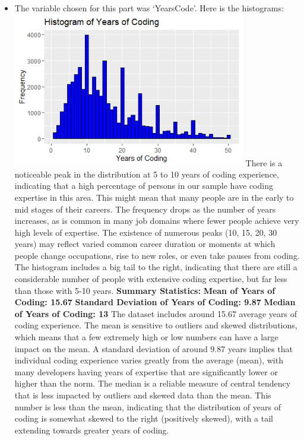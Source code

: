 \documentclass[
  12pt,
]{article}
\providecommand{\tightlist}{%
  \setlength{\itemsep}{0pt}\setlength{\parskip}{0pt}}
\begin{document}
\begin{itemize}
\tightlist
\item
  The variable chosen for this part was `YearsCode'. Here is the
  histograms:
  \includegraphics[width=0.8\textwidth,height=0.8\textheight]{yearsCode_numeric_histogram.png}
  There is a noticeable peak in the distribution at 5 to 10 years of
  coding experience, indicating that a high percentage of persons in our
  sample have coding expertise in this area. This might mean that many
  people are in the early to mid stages of their careers. The frequency
  drops as the number of years increases, as is common in many job
  domains where fewer people achieve very high levels of expertise. The
  existence of numerous peaks (10, 15, 20, 30 years) may reflect varied
  common career duration or moments at which people change occupations,
  rise to new roles, or even take pauses from coding. The histogram
  includes a big tail to the right, indicating that there are still a
  considerable number of people with extensive coding expertise, but far
  less than those with 5-10 years. \textbf{Summary Statistics:}
  \textbf{Mean of Years of Coding: 15.67} \textbf{Standard Deviation of
  Years of Coding: 9.87} \textbf{Median of Years of Coding: 13} The
  dataset includes around 15.67 average years of coding experience. The
  mean is sensitive to outliers and skewed distributions, which means
  that a few extremely high or low numbers can have a large impact on
  the mean. A standard deviation of around 9.87 years implies that
  individual coding experience varies greatly from the average (mean),
  with many developers having years of expertise that are significantly
  lower or higher than the norm. The median is a reliable measure of
  central tendency that is less impacted by outliers and skewed data
  than the mean. This number is less than the mean, indicating that the
  distribution of years of coding is somewhat skewed to the right
  (positively skewed), with a tail extending towards greater years of
  coding.
\end{itemize}
\end{document}
